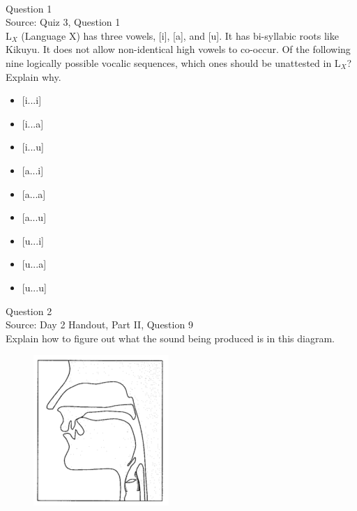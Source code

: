 \documentclass[12pt]{article}
\begin{document}
\newpage

\begin{center}
\textbf{{\color{red}{\HUGE END OF EXAM}}}\\

\end{center}
\newpage

\begin{center}
\textbf{{\color{blue}{\HUGE START OF EXAM\\}}}

\textbf{{\color{blue}{\HUGE Student ID: 4090\\}}}

\textbf{{\color{blue}{\HUGE 4:00 - 4:15 PM\\}}}

\end{center}
\newpage

{\large Question 1}\\

Source: Quiz 3, Question 1\\

L$_X$ (Language X) has three vowels, [i], [a], and [u]. It has bi-syllabic roots like Kikuyu. It does not allow non-identical high vowels to co-occur. Of the following nine logically possible vocalic sequences, which ones should be unattested in L$_X$? Explain why.\\

\begin{itemize} \item {[i...i]} \item {[i...a]} \item {[i...u]} \item {[a...i]} \item {[a...a]} \item {[a...u]} \item {[u...i]} \item {[u...a]} \item {[u...u]} \end{itemize}


\newpage

{\large Question 2}\\

Source: Day 2 Handout, Part II, Question 9\\

Explain how to figure out what the sound being produced is in this diagram.\\

\begin{figure}[H]
\includegraphics{../images/sagittal_t.png}
\end{figure}
\end{document}
